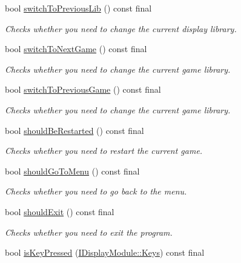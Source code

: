 \begin{DoxyCompactItemize}
bool \mbox{\hyperlink{classArcade_1_1Display_1_1Libcaca_a2a195b508b59233ca226adfb9716754b}{switch\+To\+Previous\+Lib}} () const final
\begin{DoxyCompactList}\small\item\em Checks whether you need to change the current display library. \end{DoxyCompactList}\item 
bool \mbox{\hyperlink{classArcade_1_1Display_1_1Libcaca_ab9f5be320196e902e43db50e0cdcce5e}{switch\+To\+Next\+Game}} () const final
\begin{DoxyCompactList}\small\item\em Checks whether you need to change the current game library. \end{DoxyCompactList}\item 
bool \mbox{\hyperlink{classArcade_1_1Display_1_1Libcaca_a2bb528b251b6845c1f429f9f7dc58f4f}{switch\+To\+Previous\+Game}} () const final
\begin{DoxyCompactList}\small\item\em Checks whether you need to change the current game library. \end{DoxyCompactList}\item 
bool \mbox{\hyperlink{classArcade_1_1Display_1_1Libcaca_acccbe7d671cc860dded39937073d2298}{should\+Be\+Restarted}} () const final
\begin{DoxyCompactList}\small\item\em Checks whether you need to restart the current game. \end{DoxyCompactList}\item 
bool \mbox{\hyperlink{classArcade_1_1Display_1_1Libcaca_aaa4a4a114dee18576dd93ca09808004e}{should\+Go\+To\+Menu}} () const final
\begin{DoxyCompactList}\small\item\em Checks whether you need to go back to the menu. \end{DoxyCompactList}\item 
bool \mbox{\hyperlink{classArcade_1_1Display_1_1Libcaca_a5920c296d51d72df55b5079c0749031e}{should\+Exit}} () const final
\begin{DoxyCompactList}\small\item\em Checks whether you need to exit the program. \end{DoxyCompactList}\item 
bool \mbox{\hyperlink{classArcade_1_1Display_1_1Libcaca_a4d76639289eee2453a416ff0fc051fe3}{is\+Key\+Pressed}} (\mbox{\hyperlink{classArcade_1_1Display_1_1IDisplayModule_a8da3f6b309ca0581473ae8cc8789b619}{I\+Display\+Module\+::\+Keys}}) const final

\end{DoxyCompactItemize}
